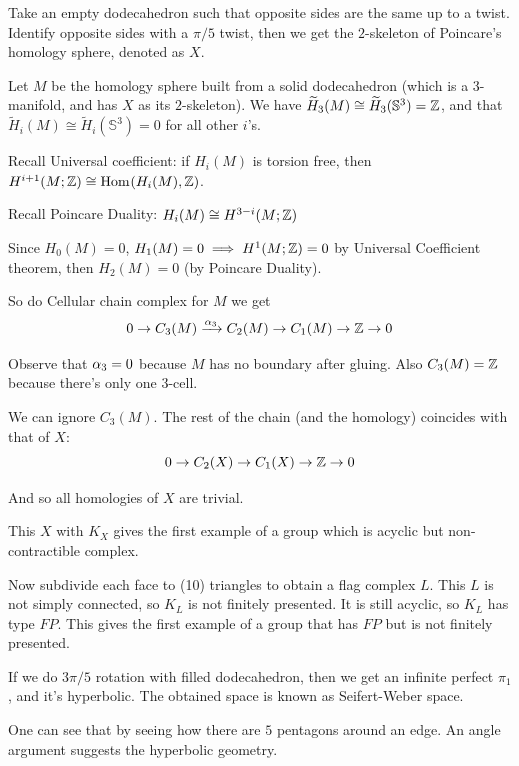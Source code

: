 \begin{example}
    \label{ex:Poincare-homology-sphere}
    Take an empty dodecahedron such that opposite sides are the same up to a twist. Identify opposite sides with a \(\pi/5\) twist, then we get the \(2\)-skeleton of Poincare's homology sphere, denoted as \(X\). 

    
    Let \(M\) be the homology sphere built from a solid dodecahedron (which is a 3-manifold, and has \(X\) as its \(2\)-skeleton). We have  \(\widetilde H_3(M) \cong \widetilde H_3(\mathbb{S}^3)= \mathbb{Z}\), and that \(\tilde H_i(M) \cong \tilde H_i(\mathbb{S}^3)= 0\)  for all other \(i\)'s.
   
    Recall Universal coefficient: if \(H_i(M)\) is torsion free, then \(H^{i+1}(M;\mathbb{Z} ) \cong \operatorname{Hom}_{{}}({H_i(M)}, {\mathbb{Z}})\).

    Recall     Poincare Duality: \(H_i(M) \cong H^{3-i}(M;\mathbb{Z})\)

    Since \(H_0(M) = 0\), \(H_1(M)=0 \implies H^1(M;\mathbb{Z}) = 0\) by Universal Coefficient theorem, then \(H_2(M)=0\) (by Poincare Duality).

    So do Cellular chain complex for \(M\) we get 
    \[0 \to C_3(M) \xrightarrow{\alpha_3} C_2(M) \to C_1(M)\to \mathbb{Z} \to 0\]

    Observe that \(\alpha_3 =0\) because \(M\) has  no boundary after gluing. Also \(C_3(M)  =\mathbb{Z}\) because there's only one \(3\)-cell.

    We can ignore \(C_3(M)\). The rest of the chain (and the homology) coincides with that of \(X\): 
    \[ 0 \to C_2(X) \to C_1(X) \to \mathbb{Z} \to 0\]

    And so all homologies of \(X\) are trivial. 

    This \(X\) with \(K_X\) gives the first example of a group which is acyclic but non-contractible complex.
    
    Now subdivide each face to (10) triangles to obtain a flag complex \(L\). This \(L\) is not simply connected, so \(K_L\) is not finitely presented. It is still acyclic, so \(K_L\) has type \(FP\). This gives the first example of a group that has \(FP\) but is not finitely presented.
\end{example}

\begin{remark}
    \label{rmk:Seifert-Weber-space}
    If we do \(3\pi/5\) rotation with filled dodecahedron, then we get an infinite perfect \(\pi_1\), and it's hyperbolic. The obtained space is known as Seifert-Weber space.

    One can see that by seeing how there are  \(5\) pentagons around an edge. An angle argument suggests the hyperbolic geometry.
\end{remark}


